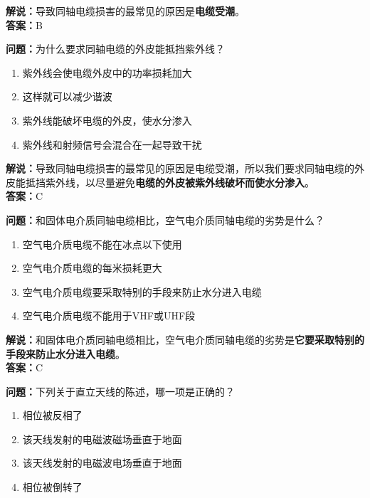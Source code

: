 \documentclass{ctexbook}
\begin{document}
\noindent\textbf{解说：}导致同轴电缆损害的最常见的原因是\textbf{电缆受潮}。\\\noindent\textbf{答案：}B


\bigskip


\noindent\textbf{问题：}为什么要求同轴电缆的外皮能抵挡紫外线？

\begin{enumerate}[label=\Alph*), leftmargin=3em]
	
	\item 紫外线会使电缆外皮中的功率损耗加大
	\item 这样就可以减少谐波
	\item 紫外线能破坏电缆的外皮，使水分渗入
	\item 紫外线和射频信号会混合在一起导致干扰
\end{enumerate}

\noindent\textbf{解说：}导致同轴电缆损害的最常见的原因是电缆受潮，所以我们要求同轴电缆的外皮能抵挡紫外线，以尽量避免\textbf{电缆的外皮被紫外线破坏而使水分渗入}。\\\noindent\textbf{答案：}C%


\bigskip


\noindent\textbf{问题：}和固体电介质同轴电缆相比，空气电介质同轴电缆的劣势是什么？

\begin{enumerate}[label=\Alph*), leftmargin=3em]
	\item 空气电介质电缆不能在冰点以下使用
	\item 空气电介质电缆的每米损耗更大
	\item 空气电介质电缆要采取特别的手段来防止水分进入电缆
	\item 空气电介质电缆不能用于VHF或UHF段
\end{enumerate}

\noindent\textbf{解说：}和固体电介质同轴电缆相比，空气电介质同轴电缆的劣势是\textbf{它要采取特别的手段来防止水分进入电缆}。\\\noindent\textbf{答案：}C%


\bigskip


\noindent\textbf{问题：}下列关于直立天线的陈述，哪一项是正确的？

\begin{enumerate}[label=\Alph*), leftmargin=3em]
	\item 相位被反相了
	\item 该天线发射的电磁波磁场垂直于地面
	\item 该天线发射的电磁波电场垂直于地面
	\item 相位被倒转了
\end{enumerate}
\end{document}

